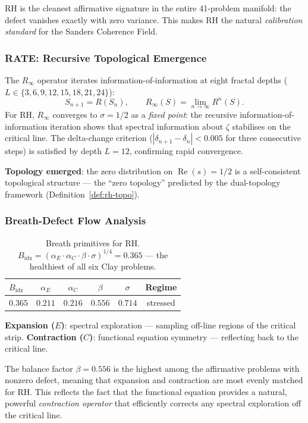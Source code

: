 \documentclass[11pt]{article}
\theoremstyle{remark}
\DeclareMathOperator{\Rea}{Re}
\begin{document}
\noindent
RH is the cleanest affirmative signature in the entire 41-problem manifold:
the defect vanishes exactly with zero variance.
This makes RH the natural \emph{calibration standard} for the Sanders
Coherence Field.

\subsubsection{RATE: Recursive Topological Emergence}

The $R_\infty$ operator iterates information-of-information at eight fractal
depths ($L \in \{3, 6, 9, 12, 15, 18, 21, 24\}$):
\[
  S_{n+1} = R(S_n), \qquad R_\infty(S) = \lim_{n \to \infty} R^n(S).
\]
For RH, $R_\infty$ converges to $\sigma = 1/2$ as a \emph{fixed point}: the
recursive information-of-information iteration shows that spectral information
about $\zeta$ stabilises on the critical line.
The delta-change criterion ($|\delta_{n+1} - \delta_n| < 0.005$ for three
consecutive steps) is satisfied by depth $L = 12$, confirming rapid convergence.

\noindent
\textbf{Topology emerged}: the zero distribution on $\Rea(s) = 1/2$ is a
self-consistent topological structure --- the ``zero topology'' predicted by the
dual-topology framework (Definition~\ref{def:rh-topo}).

\subsubsection{Breath-Defect Flow Analysis}

\begin{table}[ht]
\centering
\begin{tabular}{@{}lccccc@{}}
\toprule
$B_{\mathrm{idx}}$ & $\alpha_E$ & $\alpha_C$ & $\beta$ & $\sigma$ & Regime \\
\midrule
$0.365$ & $0.211$ & $0.216$ & $0.556$ & $0.714$ & stressed \\
\bottomrule
\end{tabular}
\caption{Breath primitives for RH.
$B_{\mathrm{idx}} = (\alpha_E \cdot \alpha_C \cdot \beta \cdot \sigma)^{1/4} = 0.365$
--- the healthiest of all six Clay problems.}
\label{tab:breath-rh}
\end{table}

\noindent
\textbf{Expansion ($E$)}: spectral exploration --- sampling off-line regions of the
critical strip.
\textbf{Contraction ($C$)}: functional equation symmetry --- reflecting back to the
critical line.

\noindent
The balance factor $\beta = 0.556$ is the highest among the affirmative problems with
nonzero defect, meaning that expansion and contraction are most evenly matched for RH.
This reflects the fact that the functional equation provides a natural, powerful
\emph{contraction operator} that efficiently corrects any spectral exploration off the
critical line.
\end{document}
